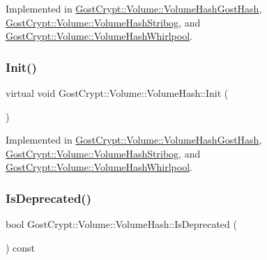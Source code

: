 Implemented in \hyperlink{class_gost_crypt_1_1_volume_1_1_volume_hash_gost_hash_aa77576ae688b9ca4f419dbf093ef6a75}{Gost\+Crypt\+::\+Volume\+::\+Volume\+Hash\+Gost\+Hash}, \hyperlink{class_gost_crypt_1_1_volume_1_1_volume_hash_stribog_a7c3a5d51633b91a39d58edd4376a6199}{Gost\+Crypt\+::\+Volume\+::\+Volume\+Hash\+Stribog}, and \hyperlink{class_gost_crypt_1_1_volume_1_1_volume_hash_whirlpool_a4e7ca73f3dd4936157a6e905d33bc4a4}{Gost\+Crypt\+::\+Volume\+::\+Volume\+Hash\+Whirlpool}.

\mbox{\label{class_gost_crypt_1_1_volume_1_1_volume_hash_a7167d7316a705369d8bc4e1cc5f2e61e}} 
\subsubsection{\texorpdfstring{Init()}{Init()}}
{\footnotesize\ttfamily virtual void Gost\+Crypt\+::\+Volume\+::\+Volume\+Hash\+::\+Init (\begin{DoxyParamCaption}{ }\end{DoxyParamCaption})\hspace{0.3cm}{\ttfamily [pure virtual]}}



Implemented in \hyperlink{class_gost_crypt_1_1_volume_1_1_volume_hash_gost_hash_a591b1b6b6056ef1b758a841bacacc931}{Gost\+Crypt\+::\+Volume\+::\+Volume\+Hash\+Gost\+Hash}, \hyperlink{class_gost_crypt_1_1_volume_1_1_volume_hash_stribog_a0b2d7f2bbf5ee60590efdff1fef219a1}{Gost\+Crypt\+::\+Volume\+::\+Volume\+Hash\+Stribog}, and \hyperlink{class_gost_crypt_1_1_volume_1_1_volume_hash_whirlpool_af787bf1be5ab88af610062c307b92738}{Gost\+Crypt\+::\+Volume\+::\+Volume\+Hash\+Whirlpool}.

\mbox{\label{class_gost_crypt_1_1_volume_1_1_volume_hash_a1ac3c5f22767ea53437c684148aad0cb}} 
\subsubsection{\texorpdfstring{Is\+Deprecated()}{IsDeprecated()}}
{\footnotesize\ttfamily bool Gost\+Crypt\+::\+Volume\+::\+Volume\+Hash\+::\+Is\+Deprecated (\begin{DoxyParamCaption}{ }\end{DoxyParamCaption}) const\hspace{0.3cm}{\ttfamily [inline]}}



